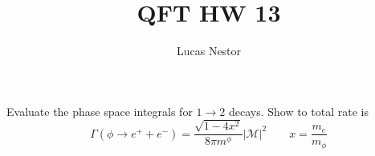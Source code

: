 \documentclass[12pt]{article}
\newenvironment{question}[2][Question]{\begin{trivlist}
\item[\hskip \labelsep {\bfseries #1}\hskip \labelsep {\bfseries #2.}]}{\end{trivlist}}
\newenvironment{questionpart}[2][Part]{\begin{trivlist}
\item[\hskip \labelsep \hskip \labelsep {\bfseries (#2)}]}{\end{trivlist}}
\begin{document}
 
 
\title{QFT HW 13}%
\author{Lucas Nestor}
 
\maketitle
 
\begin{question}{13.3}

\end{question}

\begin{questionpart}{a}
Evaluate the phase space integrals for $1\rightarrow 2$ decays. Show to total rate is
\begin{equation*}
    \Gamma(\phi\rightarrow e^++e^-)=\frac{\sqrt{1-4x^2}}{8\pi m^\phi}|\mathcal{M}|^2 \qquad x=\frac{m_e}{m_\phi}
\end{equation*}
\end{questionpart}
 
\end{document}
